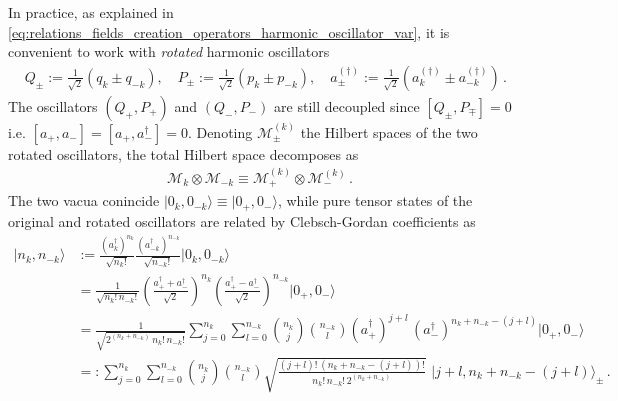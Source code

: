 \documentclass[../QFT_main.tex]{subfiles}
\begin{document}
\begin{mytheorem}
In practice, as explained in \eqref{eq:relations_fields_creation_operators_harmonic_oscillator_var}, it is convenient to work with \emph{rotated} harmonic oscillators 
\begin{align}
    &Q_\pm:= \frac{1}{\sqrt{2}} (q_k \pm q_{-k}), \quad P_\pm := \frac{1}{\sqrt{2}} (p_k \pm p_{-k}), \quad a_\pm^{(\dagger)} := \frac{1}{\sqrt{2}} (a_k^{(\dagger)} \pm a_{-k}^{(\dagger)})\,.
\end{align}
%
The oscillators {\small $(Q_+, P_+)$} and {\small $(Q_-, P_-)$} are still decoupled since {\small $[Q_\pm, P_\mp]=0$} i.e. {\small $[a_+, a_-]=[a_+, a_-^{\dagger}]=0$}.
%
Denoting $\mathcal{M}_{\pm}^{(k)}$ the Hilbert spaces of the two rotated oscillators, the total Hilbert space decomposes as
\begin{align}
     \mathcal{M}_k \otimes \mathcal{M}_{-k} \equiv \mathcal{M}^{(k)}_+ \otimes \mathcal{M}_-^{(k)}\,.
\end{align}
%
The two vacua conincide {\small $|0_k, 0_{-k}\rangle \equiv |0_+, 0_-\rangle$}, while pure tensor states of the original and rotated oscillators are related by Clebsch-Gordan coefficients as
{\small
\begin{align}\label{eq:clebsh_gordan_relation_original_rotated_oscillator_states}
    |n_k, n_{-k}\rangle &:= \frac{(a_k^{\dagger})^{n_k}}{\sqrt{n_k!}} \frac{(a_{-k}^{\dagger})^{n_{-k}}}{\sqrt{n_{-k}!}} |0_k, 0_{-k}\rangle
    \\
    &= \frac{1}{\sqrt{n_k!\, n_{-k}!}} \left( \frac{a_+^{\dagger} + a_-^{\dagger}}{\sqrt{2}} \right)^{n_k} \left( \frac{a_+^{\dagger} - a_-^{\dagger}}{\sqrt{2}} \right)^{n_{-k}} |0_+, 0_-\rangle
    \\
    &= \frac{1}{\sqrt{2^{(n_k + n_{-k})}\,n_k!\, n_{-k}!}}\sum_{j=0}^{n_k} \sum_{l=0}^{n_{-k}} \binom{n_k}{j} \binom{n_{-k}}{l} (a_+^{\dagger})^{j+l}\, (a_-^{\dagger})^{n_k + n_{-k} - (j+l)} |0_+, 0_-\rangle
    \\
    &=: \sum_{j=0}^{n_k} \sum_{l=0}^{n_{-k}} \binom{n_k}{j} \binom{n_{-k}}{l}\sqrt{\frac{(j+l)!\, (n_k + n_{-k} - (j+l))!}{n_k!\, n_{-k}!\, 2^{(n_k+n_{-k})}}}\,\,| j+l, n_k + n_{-k} - (j+l)\rangle_{\pm}\,.
\end{align}
}


\end{mytheorem}
\end{document}
